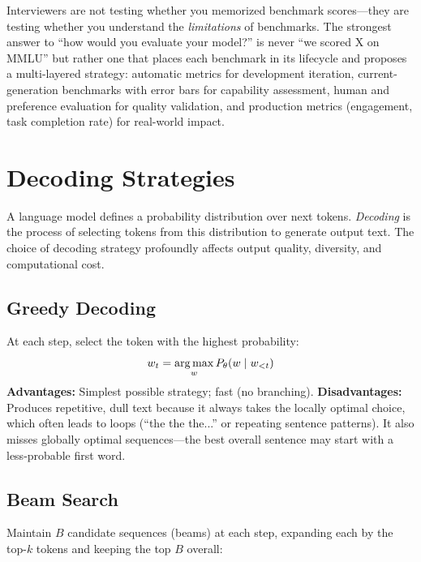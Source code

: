 \begin{keyinsight}
Interviewers are not testing whether you memorized benchmark scores---they are
testing whether you understand the \emph{limitations} of benchmarks.  The
strongest answer to ``how would you evaluate your model?'' is never ``we scored
X on MMLU'' but rather one that places each benchmark in its lifecycle and
proposes a multi-layered strategy: automatic metrics for development
iteration, current-generation benchmarks with error bars for capability
assessment, human and preference evaluation for quality validation, and
production metrics (engagement, task completion rate) for real-world impact.
\end{keyinsight}

\section{Decoding Strategies}
\label{sec:decoding}

A language model defines a probability distribution over next tokens.
\emph{Decoding} is the process of selecting tokens from this distribution to
generate output text.  The choice of decoding strategy profoundly affects output
quality, diversity, and computational cost.

\subsection{Greedy Decoding}

At each step, select the token with the highest probability:
\[
    w_t = \operatorname*{arg\,max}_{w} P_\theta(w \mid w_{<t})
\]
\textbf{Advantages:} Simplest possible strategy; fast (no branching).
\textbf{Disadvantages:} Produces repetitive, dull text because it always takes
the locally optimal choice, which often leads to loops (``the the the...'' or
repeating sentence patterns).  It also misses globally optimal sequences---the
best overall sentence may start with a less-probable first word.

\subsection{Beam Search}

Maintain $B$ candidate sequences (beams) at each step, expanding each by the
top-$k$ tokens and keeping the top $B$ overall:

